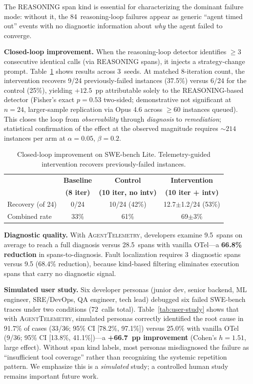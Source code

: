 \documentclass{article}
\begin{document}
The REASONING span kind is essential for characterizing the dominant
failure mode: without it, the 84~reasoning-loop failures appear as
generic ``agent timed out'' events with no diagnostic information
about \emph{why} the agent failed to converge.

\textbf{Closed-loop improvement.}
When the reasoning-loop detector identifies $\geq$3 consecutive
identical calls (via REASONING spans), it injects a strategy-change
prompt.  Table~\ref{tab:closed-loop} shows results across 3~seeds.
At matched 8-iteration count, the intervention recovers 9/24
previously-failed instances (37.5\%) versus 6/24 for the control
(25\%), yielding $+12.5$~pp attributable solely to the REASONING-based
detector (Fisher's exact $p{=}0.53$ two-sided; demonstrative not
significant at $n{=}24$, larger-sample replication via Opus 4.6
across $\geq{}60$ instances queued).  This closes the loop from
\emph{observability} through \emph{diagnosis} to \emph{remediation};
statistical confirmation of the effect at the observed magnitude
requires $\sim{}214$ instances per arm at $\alpha{=}0.05$, $\beta{=}0.2$.

\begin{table}[t]
\centering
\small
\caption{Closed-loop improvement on SWE-bench Lite.  Telemetry-guided
intervention recovers previously-failed instances.}
\label{tab:closed-loop}
\begin{tabular}{@{}lccc@{}}
\toprule
& \textbf{Baseline} & \textbf{Control} & \textbf{Intervention} \\
& \textbf{(8 iter)} & \textbf{(10 iter, no intv)} & \textbf{(10 iter + intv)} \\
\midrule
Recovery (of 24)   & 0/24  & 10/24 (42\%) & 12.7$\pm$1.2/24 (53\%) \\
Combined rate      & 33\%  & 61\%        & 69$\pm$3\% \\
\bottomrule
\end{tabular}
\end{table}

\textbf{Diagnostic quality.}
With \textsc{AgentTelemetry}, developers examine 9.5~spans on average
to reach a full diagnosis versus 28.5~spans with vanilla OTel---a
\textbf{66.8\% reduction} in spans-to-diagnosis.  Fault localization
requires 3~diagnostic spans versus 9.5 (68.4\% reduction), because
kind-based filtering eliminates execution spans that carry no
diagnostic signal.

\textbf{Simulated user study.}
Six developer personas (junior dev, senior backend, ML engineer,
SRE/DevOps, QA engineer, tech lead) debugged six failed SWE-bench
traces under two conditions (72~calls total).  Table~\ref{tab:user-study}
shows that with \textsc{AgentTelemetry}, simulated personas correctly
identified the root cause in 91.7\% of cases (33/36; 95\% CI
[78.2\%, 97.1\%]) versus 25.0\% with vanilla OTel (9/36; 95\% CI
[13.8\%, 41.1\%])---a \textbf{+66.7~pp improvement} (Cohen's $h=1.51$,
large effect).  Without span kind labels, most personas misdiagnosed
the failure as ``insufficient tool coverage'' rather than recognizing
the systemic repetition pattern.  We emphasize this is a
\emph{simulated} study; a controlled human study remains important
future work.
\end{document}
